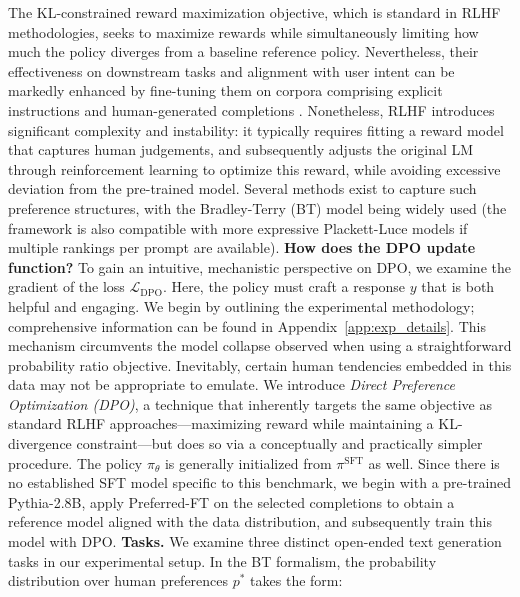 The KL-constrained reward maximization objective, which is standard in RLHF methodologies, seeks to maximize rewards while simultaneously limiting how much the policy diverges from a baseline reference policy. Nevertheless, their effectiveness on downstream tasks and alignment with user intent can be markedly enhanced by fine-tuning them on corpora comprising explicit instructions and human-generated completions \citep{mishra-etal-2022-cross,sanh2022multitask,chung2022scaling,thoppilan2022lamda}. Nonetheless, RLHF introduces significant complexity and instability: it typically requires fitting a reward model that captures human judgements, and subsequently adjusts the original LM through reinforcement learning to optimize this reward, while avoiding excessive deviation from the pre-trained model. Several methods exist to capture such preference structures, with the Bradley-Terry (BT) model \cite{bradley1952rankanalysis} being widely used (the framework is also compatible with more expressive Plackett-Luce models \citep{plackett1975analysis, luce2012individual} if multiple rankings per prompt are available). \textbf{How does the DPO update function?} To gain an intuitive, mechanistic perspective on DPO, we examine the gradient of the loss $\mathcal{L}_\text{DPO}$. Here, the policy must craft a response $y$ that is both helpful and engaging. We begin by outlining the experimental methodology; comprehensive information can be found in Appendix~\ref{app:exp_details}. This mechanism circumvents the model collapse observed when using a straightforward probability ratio objective. Inevitably, certain human tendencies embedded in this data may not be appropriate to emulate. We introduce \textit{{Direct Preference Optimization} (DPO)}, a technique that inherently targets the same objective as standard RLHF approaches—maximizing reward while maintaining a KL-divergence constraint—but does so via a conceptually and practically simpler procedure. The policy $\pi_\theta$ is generally initialized from $\pi^\text{SFT}$ as well. Since there is no established SFT model specific to this benchmark, we begin with a pre-trained Pythia-2.8B, apply Preferred-FT on the selected completions to obtain a reference model aligned with the data distribution, and subsequently train this model with DPO. \textbf{Tasks.} We examine three distinct open-ended text generation tasks in our experimental setup. In the BT formalism, the probability distribution over human preferences $p^*$ takes the form:

